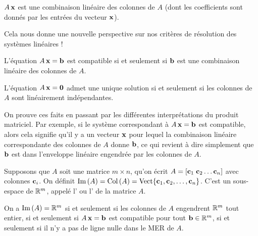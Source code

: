 \begin{fac} $A\,\mathbf{x}$ est une combinaison linéaire des colonnes de $A$ (dont les 
coefficients sont donnés par les entr\'ees du vecteur $\mathbf{x}$).\end{fac}

Cela nous donne une nouvelle perspective sur nos critères de résolution des systèmes linéaires !


\begin{fac} L'équation $A\,\mathbf{x}=\mathbf{b}$ est compatible si et seulement si $\mathbf{b}$ est une combinaison linéaire
des colonnes de $A$.\end{fac}

\begin{fac} L'équation $A\,\mathbf{x}=\mathbf{0}$ admet une unique solution si et seulement si les colonnes de $A$ sont
linéairement indépendantes.\end{fac}

On prouve ces faits en passant par les différentes interprétations
du produit matriciel.  Par exemple, si le système correspondant à $A\,\mathbf{x}=\mathbf{b}$ 
est compatible, alors cela signifie qu'il y a un vecteur $\mathbf{x}$ pour lequel la combinaison linéaire correspondante 
des colonnes de $A$ donne $\mathbf{b}$, ce qui revient à dire simplement que
$\mathbf{b}$ est dans l'enveloppe lin\'eaire engendr\'ee par les colonnes de $A$.  

\begin{definition}
Supposons que $A$ soit une matrice $m\times n$, qu'on écrit $A = [\mathbf{c}_1\; \mathbf{c}_2 \ldots \mathbf{c}_n]$ avec
colonnes $\mathbf{c}_i$.  
On définit $\operatorname{Im}\,(A)=\operatorname{Col\,}(A) = \textrm{Vect}\{\mathbf{c}_1,\mathbf{c}_2, \ldots, \mathbf{c}_n\}$.  C'est un sous-espace de $\mathbb{R}^m$,
appelé l' ou l' de la matrice $A$.
\end{definition}


\begin{fac} On a $\operatorname{Im}\,(A) = \mathbb{R}^m$ si et seulement si les colonnes de $A$ engendrent $\mathbb{R}^m$ tout entier, 
si et seulement si $A\,\mathbf{x}=\mathbf{b}$ est compatible pour tout $\mathbf{b}\in \mathbb{R}^m$, si et seulement
si il n'y a pas de ligne nulle dans le MER de $A$.\end{fac}

